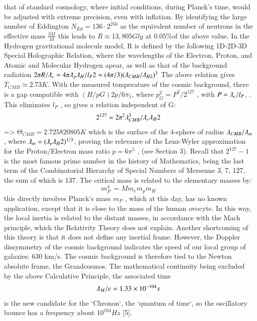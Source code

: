 \documentclass[twoside,draft]{article}
\begin{document}
{that of standard cosmology, where initial conditions, during Planck's time, would be adjusted with
extreme precision, even with inflation. By identifying the large number of Eddington $N_{Ed} = 136 \cdot
2^{256}$ as the equivalent number of neutrons in the effective mass $\frac{3M}{10}$ this leads to $R \approx 13,805
Gly$ at $0.05\%$of the above value.
In the Hydrogen gravitational molecule model, R is defined by the following 1D-2D-3D Special
Holographic Relation, where the wavelengths of the Electron, Proton, and Atomic and Molecular
Hydrogen apear, as well as that of the background radiation
$2 \pi R/\lambdabar_{e} = 4 \pi \lambdabar_{p} \lambdabar_{H} /l_{P} 2 \simeq (4\pi/3)(\lambdabar_{CMB} /\lambdabar_{H2})^{3}$
The above relation gives $T_{CMB} \simeq 2.73 K$. With the measured temperature of the cosmic
background, there is a gap compatible with $(H/p G ) 2 p/6\pi_{5} $, where $p_{G}^{2} = P^{2} /2^{127}$ , with $P = \lambdabar_{e} /l_{P}$, . 
This eliminates $l_{P}$ , so gives a relation independent of G:
$$2^{127} = 2\pi^{2} \lambda_{CMB}^{3} /\lambdabar_{e} \lambdabar_{H} 2$$
=> $\Theta_{CMB} = 2.725820805 K$ which is the surface of the 4-sphere of radius $\lambda_{CMB} / \lambdabar_{m}$, where $\lambdabar_{m} = (\lambdabar_{e} \lambdabar_{H} 2 )^{1/3} $, proving the relevance of
the Lenz-Wyler approximation for the Proton/Electron mass ratio $p = 6\pi^{5}$ , (see Section 3). Recall
that $2^{127} - 1$ is the most famous prime number in the history of Mathematics, being the last term of
the Combinatorial Hierarchy of Special Numbers of Mersenne 3, 7, 127, the sum of which is 137.
The critical mass is related to the elementary masses by:
\begin{equation}
m_{P}^{4}\, = M m_{e} m_{p} m_{H}
\end{equation}
this directly involves Planck's mass $m_{P}$ , which at this day, has no known application, except
that it is close to the mass of the human ovocyte. In this way, the local inertia is related to the distant
masses, in accordance with the Mach principle, which the Relativity Theory does not explain.
Another shortcoming of this theory is that it does not define any inertial frame. However, the
Doppler dissymmetry of the cosmic background indicates the speed of our local group of galaxies:
630 km/s. The cosmic background is therefore tied to the Newton absolute frame, the Grandcosmos.
The mathematical continuity being excluded by the above Calculative Principle, the associated
time 
\begin{equation}
\lambdabar_{M} /c = 1.33 \times 10^{-104}s
\end{equation}
is the new candidate for the `Chronon`, the `quantum of time`, so the
oscillatory bounce has a frequency about $10^{104}Hz$ \cite{fm2}[5].

}
\end{document}

